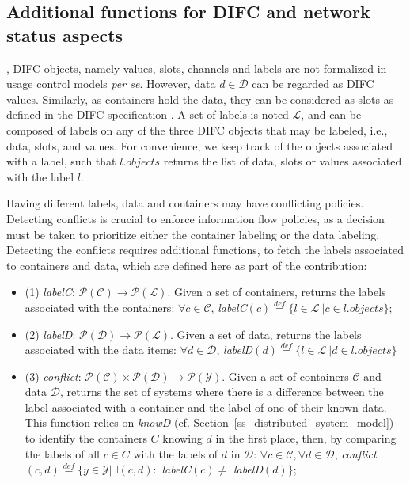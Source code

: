 \subsection{Additional functions for DIFC and network status aspects}
, DIFC objects, namely values, slots, channels and labels are not formalized in usage control models \emph{per se}. However, data $d \in \mathcal{D}$ can be regarded as DIFC values. Similarly, as containers hold the data, they can be considered as slots as defined in the DIFC specification . A set of labels is noted $\mathcal{L}$, and can be composed of labels on any of the three DIFC objects that may be labeled, i.e., data, slots, and values. For convenience, we keep track of the objects associated with a label, such that $l.objects$ returns the list of data, slots or values associated with the label $l$. 

Having different labels, data and containers may have conflicting policies. Detecting conflicts is crucial to enforce information flow policies, as a decision must be taken to prioritize either the container labeling or the data labeling. Detecting the conflicts requires additional functions, to fetch the labels associated to containers and data, which are defined here as part of the contribution:
\begin{itemize}
    \item[] (1) \emph{labelC}: $\mathcal{P}(\mathcal{C}) \to \mathcal{P}(\mathcal{L})$. Given a set of containers, returns the labels associated with the containers: $\forall c \in \mathcal{C}$, \emph{labelC}$(c) \overset{def}{=} \{ l \in \mathcal{L} \ | c \in l.objects \} $; 
    \item[] (2) \emph{labelD}: $\mathcal{P}(\mathcal{D}) \to \mathcal{P}(\mathcal{L})$.
    Given a set of data, returns the labels associated with the data items: $ \forall d \in \mathcal{D}$, \emph{labelD}$(d) \overset{def}{=} \{ l \in \mathcal{L} \ | d \in l.objects \} $
    \item[] (3) \emph{conflict}: $\mathcal{P}(\mathcal{C}) \times \mathcal{P}(\mathcal{D}) \to \mathcal{P}(\mathcal{Y}) $. Given a set of containers $\mathcal{C}$ and data $\mathcal{D}$, returns the set of systems where there is a difference between the label associated with a container and the label of one of their known data. This function relies on \emph{knowD} (cf. Section \ref{ss_distributed_system_model}) to identify the containers $C$ knowing $d$ in the first place, then, by comparing the labels of all $c \in C$ with the labels of $d$ in $\mathcal{D}$:
    $ \forall c \in \mathcal{C}, \forall d \in \mathcal{D}
    $, \emph{conflict}$(c,d) \overset{def}{=} \{ y \in \mathcal{Y} | \exists (c,d) :$ \emph{labelC}$(c) \neq$ \emph{labelD}$(d) \}$;
\end{itemize}

